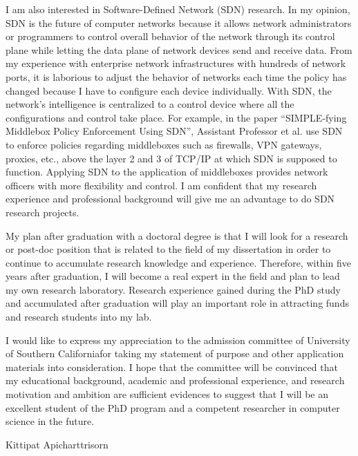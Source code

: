 \documentclass[a4paper,10pt]{report}
\newcommand{\university}{University of Southern California}
\begin{document}
\vspace{0.2cm}
I am also interested in Software-Defined Network (SDN) research. In my opinion, SDN is the future of computer networks because it allows network administrators or programmers to control overall behavior of the network through its control plane while letting the data plane of network devices send and receive data. From my experience with enterprise network infrastructures with hundreds of network ports, it is laborious to adjust the behavior of networks each time the policy has changed because I have to configure each device individually. With SDN, the network's intelligence is centralized to a control device where all the configurations and control take place. For example, in the paper ``SIMPLE-fying Middlebox Policy Enforcement Using SDN'', Assistant Professor et al. use SDN to enforce policies regarding middleboxes such as firewalls, VPN gateways, proxies, etc., above the layer 2 and 3 of TCP/IP at which SDN is supposed to function. Applying SDN to the application of middleboxes provides network officers with more flexibility and control. I am confident that my research experience and professional background will give me an advantage to do SDN research projects.

\vspace{0.2cm}
My plan after graduation with a doctoral degree is that I will look for a research or post-doc position that is related to the field of my dissertation in order to continue to accumulate research knowledge and experience. Therefore, within five years after graduation, I will become a real expert in the field and plan to lead my own research laboratory. Research experience gained during the PhD study and accumulated after graduation will play an important role in attracting funds and research students into my lab.

\vspace{0.2cm}
I would like to express my appreciation to the admission committee of \university \space for taking my statement of purpose and other application materials into consideration. I hope that the committee will be convinced that my educational background, academic and professional experience, and research motivation and ambition are sufficient evidences to suggest that I will be an excellent student of the PhD program and a competent researcher in computer science in the future.

\vspace{1cm}
\raggedleft Kittipat Apicharttrisorn
\end{document}
